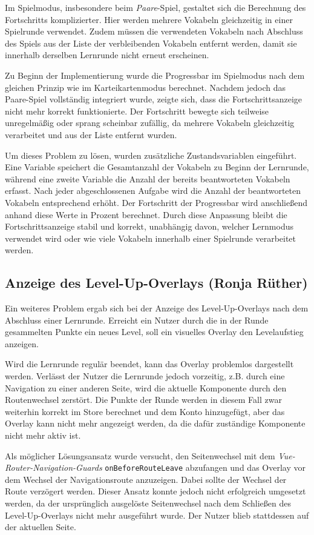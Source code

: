 Im Spielmodus, insbesondere beim \textit{Paare}-Spiel, gestaltet sich die Berechnung des Fortschritts komplizierter. 
Hier werden mehrere Vokabeln gleichzeitig in einer Spielrunde verwendet. 
Zudem müssen die verwendeten Vokabeln nach Abschluss des Spiels aus der Liste der verbleibenden Vokabeln entfernt werden, damit sie innerhalb derselben Lernrunde nicht erneut erscheinen.

Zu Beginn der Implementierung wurde die Progressbar im Spielmodus nach dem gleichen Prinzip wie im Karteikartenmodus berechnet. 
Nachdem jedoch das Paare-Spiel vollständig integriert wurde, zeigte sich, dass die Fortschrittsanzeige nicht mehr korrekt funktionierte. 
Der Fortschritt bewegte sich teilweise unregelmäßig oder sprang scheinbar zufällig, da mehrere Vokabeln gleichzeitig verarbeitet und aus der Liste entfernt wurden.

Um dieses Problem zu lösen, wurden zusätzliche Zustandsvariablen eingeführt. 
Eine Variable speichert die Gesamtanzahl der Vokabeln zu Beginn der Lernrunde, während eine zweite Variable die Anzahl der bereits beantworteten Vokabeln erfasst. 
Nach jeder abgeschlossenen Aufgabe wird die Anzahl der beantworteten Vokabeln entsprechend erhöht.
Der Fortschritt der Progressbar wird anschließend anhand diese Werte in Prozent berechnet.
Durch diese Anpassung bleibt die Fortschrittsanzeige stabil und korrekt, unabhängig davon, welcher Lernmodus verwendet wird oder wie viele Vokabeln innerhalb einer Spielrunde verarbeitet werden.

\subsection{Anzeige des Level-Up-Overlays (Ronja Rüther)}
Ein weiteres Problem ergab sich bei der Anzeige des Level-Up-Overlays nach dem Abschluss einer Lernrunde.
Erreicht ein Nutzer durch die in der Runde gesammelten Punkte ein neues Level, soll ein visuelles Overlay den Levelaufstieg anzeigen.

Wird die Lernrunde regulär beendet, kann das Overlay problemlos dargestellt werden. 
Verlässt der Nutzer die Lernrunde jedoch vorzeitig, z.B. durch eine Navigation zu einer anderen Seite, wird die aktuelle Komponente durch den Routenwechsel zerstört.
Die Punkte der Runde werden in diesem Fall zwar weiterhin korrekt im Store berechnet und dem Konto hinzugefügt, aber das Overlay kann nicht mehr angezeigt werden, da die dafür zuständige Komponente nicht mehr aktiv ist.

Als möglicher Lösungsansatz wurde versucht, den Seitenwechsel mit dem \textit{Vue-Router-Navigation-Guards} \texttt{onBeforeRouteLeave} abzufangen und das Overlay vor dem Wechsel der Navigationsroute anzuzeigen.
Dabei sollte der Wechsel der Route verzögert werden. 
Dieser Ansatz konnte jedoch nicht erfolgreich umgesetzt werden, da der ursprünglich ausgelöste Seitenwechsel nach dem Schließen des Level-Up-Overlays nicht mehr ausgeführt wurde.
Der Nutzer blieb stattdessen auf der aktuellen Seite.

